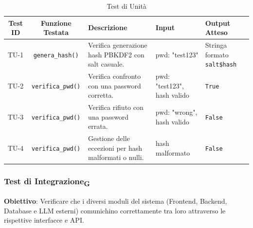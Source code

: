 \documentclass[11pt,a4paper]{article}
\begin{document}
\begin{table}[H]
    \centering
    \small %
    \begin{tabularx}{\textwidth}{|c|c|X|p{2.5cm}|p{2.5cm}|}
        \hline
        \textbf{Test ID} & \textbf{Funzione Testata} & \textbf{Descrizione} & \textbf{Input} & \textbf{Output Atteso} \\
        \hline
        TU-1 & \texttt{genera\_hash()} & Verifica generazione hash PBKDF2 con salt casuale. & pwd: "test123" & Stringa formato \texttt{salt\$hash} \\
        \hline
        TU-2 & \texttt{verifica\_pwd()} & Verifica confronto con una password corretta. & pwd: "test123", hash valido & \texttt{True} \\
        \hline
        TU-3 & \texttt{verifica\_pwd()} & Verifica rifiuto con una password errata. & pwd: "wrong", hash valido & \texttt{False} \\
        \hline
        TU-4 & \texttt{verifica\_pwd()} & Gestione delle eccezioni per hash malformati o nulli. & hash malformato & \texttt{False} \\
        \hline
    \end{tabularx}
    \caption{Test di Unità}
\end{table}

\subsubsection{Test di Integrazione\textsubscript{G}}
\textbf{Obiettivo}: Verificare che i diversi moduli del sistema (Frontend, Backend, Database e LLM esterni) comunichino correttamente tra loro attraverso le rispettive interfacce e API.
\end{document}
